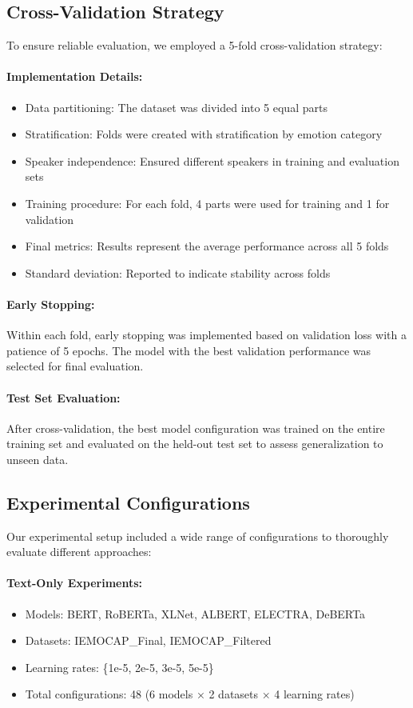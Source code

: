 \documentclass[12pt]{article}
\begin{document}
\subsection{Cross-Validation Strategy}
To ensure reliable evaluation, we employed a 5-fold cross-validation strategy:

\paragraph{Implementation Details:}
\begin{itemize}
    \item Data partitioning: The dataset was divided into 5 equal parts
    \item Stratification: Folds were created with stratification by emotion category
    \item Speaker independence: Ensured different speakers in training and evaluation sets
    \item Training procedure: For each fold, 4 parts were used for training and 1 for validation
    \item Final metrics: Results represent the average performance across all 5 folds
    \item Standard deviation: Reported to indicate stability across folds
\end{itemize}

\paragraph{Early Stopping:}
Within each fold, early stopping was implemented based on validation loss with a patience of 5 epochs. The model with the best validation performance was selected for final evaluation.

\paragraph{Test Set Evaluation:}
After cross-validation, the best model configuration was trained on the entire training set and evaluated on the held-out test set to assess generalization to unseen data.

\subsection{Experimental Configurations}
Our experimental setup included a wide range of configurations to thoroughly evaluate different approaches:

\paragraph{Text-Only Experiments:}
\begin{itemize}
    \item Models: BERT, RoBERTa, XLNet, ALBERT, ELECTRA, DeBERTa
    \item Datasets: IEMOCAP\_Final, IEMOCAP\_Filtered
    \item Learning rates: \{1e-5, 2e-5, 3e-5, 5e-5\}
    \item Total configurations: 48 (6 models × 2 datasets × 4 learning rates)
\end{itemize}
\end{document}
